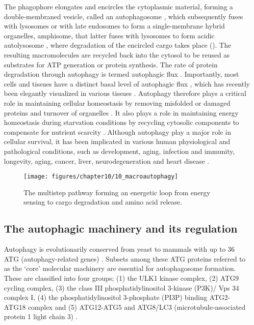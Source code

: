 The phagophore elongates and encircles the cytoplasmic material, forming a double-membraned vesicle, called an autophagosome \citep{Cai2012,Levine2008}, which subsequently fuses with lysosomes or with late endosomes to form a single-membrane hybrid organelles, amphisome, that latter fuses with lysosomes to form acidic autolysosome \citep{Cai2012,Nixon2011,sarkar2013}, where degradation of the encircled cargo takes place (). The resulting macromolecules are recycled back into the cytosol to be reused as substrates for ATP generation or protein synthesis. The rate of protein degradation through autophagy is termed autophagic flux \citep{klionsky2016,loos2014}. Importantly, most cells and tissues have a distinct basal level of autophagic flux \citep{Mizushima2004a}, which has recently been elegantly visualized in various tissues \citep{Kaizuka2016}. Autophagy therefore plays a critical role in maintaining cellular homeostasis by removing misfolded or damaged proteins and turnover of organelles \citep{Levine2008}. It also plays a role in maintaining energy homeostasis during starvation conditions by recycling cytosolic components to compensate for nutrient scarcity \citep{Levine2008,Loos2009}. Although autophagy play a major role in cellular survival, it has been implicated in various human physiological and pathological conditions, such as development, aging, infection and immunity, longevity, aging, cancer, liver, neurodegeneration and heart disease \citep{Meijer2006,Mizushima2008,Ravikumar2010b,sarkar2013}.

\begin{figure}[!htbp]
  \texttt{[image: figures/chapter10/10\_macroautophagy]}
  \caption[The multistep pathway forming an energetic loop]{The multistep pathway forming an energetic loop from energy sensing to cargo degradation and amino acid release.}
  \label{fig:10_macroautophagy}
\end{figure}

\subsection{The autophagic machinery and its regulation}
Autophagy is evolutionarily conserved from yeast to mammals with up to 36 ATG (autophagy-related genes) \citep{Thumm1994,Tsukada1993,Klionsky2007,Mizushima2010}. Subsets among these ATG proteins referred to as the ‘core’ molecular machinery are essential for autophagosome formation. These are classified into four groups; (1) the ULK1 kinase complex, (2) ATG9 cycling complex, (3) the class III phosphatidylinositol 3-kinase (P3K)/ Vps 34 complex I, (4) the phosphatidylinositol 3-phosphate (PI3P) binding ATG2-ATG18 complex and (5) ATG12-ATG5 and ATG8/LC3 (microtubule-associated protein 1 light chain 3) \citep{Feng2014,Yang2010}.

